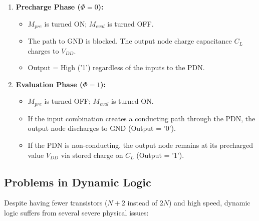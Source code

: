 \documentclass[12pt,a4paper]{article}
\begin{document}
\begin{enumerate}[label=\arabic*., leftmargin=*]
  \item \textbf{Precharge Phase ($\Phi = 0$):}
    \begin{itemize}
      \item $M_{pre}$ is turned ON; $M_{eval}$ is turned OFF.
      \item The path to GND is blocked. The output node charge capacitance $C_L$ charges to $V_{DD}$.
      \item Output = High ('1') regardless of the inputs to the PDN.
    \end{itemize}
  \item \textbf{Evaluation Phase ($\Phi = 1$):}
    \begin{itemize}
      \item $M_{pre}$ is turned OFF; $M_{eval}$ is turned ON.
      \item If the input combination creates a conducting path through the PDN, the output node discharges to GND (Output = '0').
      \item If the PDN is non-conducting, the output node remains at its precharged value $V_{DD}$ via stored charge on $C_L$ (Output = '1').
    \end{itemize}
\end{enumerate}

\subsection{Problems in Dynamic Logic}
Despite having fewer transistors ($N+2$ instead of $2N$) and high speed, dynamic logic suffers from several severe physical issues:
\end{document}
